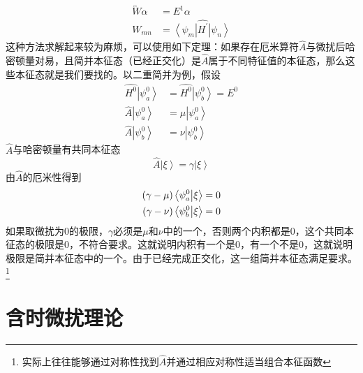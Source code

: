 \documentclass[12pt, a4paper, oneside]{ctexart}
\begin{document}
	\begin{align}
		\overleftrightarrow{W}\alpha&=E^{1}\alpha\\
		W_{mn}&=\left<\psi_{m}\right|\hat{H^{\prime}}\left|\psi_{n}\right>
	\end{align}
	\quad\quad 这种方法求解起来较为麻烦，可以使用如下定理：如果存在厄米算符$\hat{A}$与微扰后哈密顿量对易，且简并本征态（已经正交化）是$\hat{A}$属于不同特征值的本征态，那么这些本征态就是我们要找的。以二重简并为例，假设
	\begin{align}
		\hat{H^{0}}\left|\psi_{a}^{0}\right>&=\hat{H^{0}}\left|\psi_{b}^{0}\right>=E^{0}\\
		\hat{A}\left|\psi_{a}^{0}\right>&=\mu\left|\psi_{a}^{0}\right>\\
		\hat{A}\left|\psi_{b}^{0}\right>&=\nu\left|\psi_{b}^{0}\right>
	\end{align}
	\quad\quad $\hat{A}$与哈密顿量有共同本征态
	\begin{equation}
		\hat{A}\left|\xi\right>=\gamma\left|\xi\right>
	\end{equation}
	\quad\quad 由$\hat{A}$的厄米性得到
	\begin{align}
		(\gamma-\mu)\left<\psi_{a}^{0}\big{|}\xi\right>&=0\\
		(\gamma-\nu)\left<\psi_{b}^{0}\big{|}\xi\right>&=0
	\end{align}
	\quad\quad 如果取微扰为$0$的极限，$\gamma$必须是$\mu$和$\nu$中的一个，否则两个内积都是$0$，这个共同本征态的极限是$0$，不符合要求。这就说明内积有一个是$0$，有一个不是$0$，这就说明极限是简并本征态中的一个。由于已经完成正交化，这一组简并本征态满足要求。\footnote{实际上往往能够通过对称性找到$\hat{A}$并通过相应对称性适当组合本征函数}
	\section{含时微扰理论}
	
\end{document}
